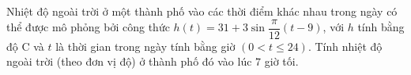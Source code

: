 \begin{bt}%
Nhiệt độ ngoài trời ở một thành phố vào các thời điểm khác nhau trong ngày có
thể được mô phỏng bởi công thức $h(t)=31+3\sin \dfrac{\pi}{12}(t-9)$, với $h$ tính bằng độ $\mathrm{C}$ và $t$ là thời gian trong ngày tính bằng giờ $(0<t\leq 24)$.
Tính nhiệt độ ngoài trời (theo đơn vị độ) ở thành phố đó vào lúc $7$ giờ tối. 
\end{bt}

